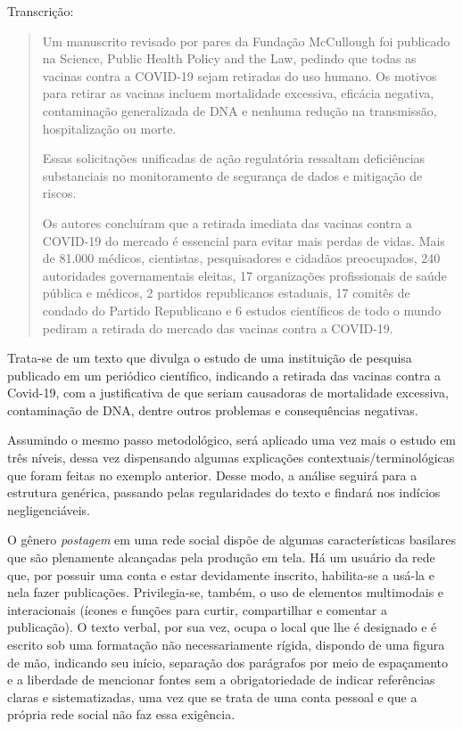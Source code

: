 \documentclass[portuguese]{textolivre}
\begin{document}
Transcrição:

\begin{quote}
    Um manuscrito revisado por pares da Fundação McCullough foi publicado na Science, Public Health Policy and the Law, pedindo que todas as vacinas contra a COVID-19 sejam retiradas do uso humano. Os motivos para retirar as vacinas incluem mortalidade excessiva, eficácia negativa, contaminação generalizada de DNA e nenhuma redução na transmissão, hospitalização ou morte.
    
Essas solicitações unificadas de ação regulatória ressaltam deficiências substanciais no monitoramento de segurança de dados e mitigação de riscos.

Os autores concluíram que a retirada imediata das vacinas contra a COVID-19 do mercado é essencial para evitar mais perdas de vidas. Mais de 81.000 médicos, cientistas, pesquisadores e cidadãos preocupados, 240 autoridades governamentais eleitas, 17 organizações profissionais de saúde pública e médicos, 2 partidos republicanos estaduais, 17 comitês de condado do Partido Republicano e 6 estudos científicos de todo o mundo pediram a retirada do mercado das vacinas contra a COVID-19.
\end{quote}

Trata-se de um texto que divulga o estudo de uma instituição de pesquisa publicado em um periódico científico, indicando a retirada das vacinas contra a Covid-19, com a justificativa de que seriam causadoras de mortalidade excessiva, contaminação de DNA, dentre outros problemas e consequências negativas.

Assumindo o mesmo passo metodológico, será aplicado uma vez mais o estudo em três níveis, dessa vez dispensando algumas explicações contextuais/terminológicas que foram feitas no exemplo anterior. Desse modo, a análise seguirá para a estrutura genérica, passando pelas regularidades do texto e findará nos indícios negligenciáveis.

O gênero \textit{postagem} em uma rede social dispõe de algumas características basilares que são plenamente alcançadas pela produção em tela. Há um usuário da rede que, por possuir uma conta e estar devidamente inscrito, habilita-se a usá-la e nela fazer publicações. Privilegia-se, também, o uso de elementos multimodais e interacionais (ícones e funções para curtir, compartilhar e comentar a publicação). O texto verbal, por sua vez, ocupa o local que lhe é designado e é escrito sob uma formatação não necessariamente rígida, dispondo de uma figura de mão, indicando seu início, separação dos parágrafos por meio de espaçamento e a liberdade de mencionar fontes sem a obrigatoriedade de indicar referências claras e sistematizadas, uma vez que se trata de uma conta pessoal e que a própria rede social não faz essa exigência.
\end{document}
